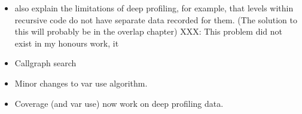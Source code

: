 %

\begin{itemize}
\item also explain the limitations of deep profiling,
      for example, that levels within recursive code do not have separate
      data recorded for them.
      (The solution to this will probably be in the overlap chapter)
      XXX: This problem did not exist in my honours work, it
\item Callgraph search
\item Minor changes to var use algorithm.
\item Coverage (and var use) now work on deep profiling data.
\end{itemize}



